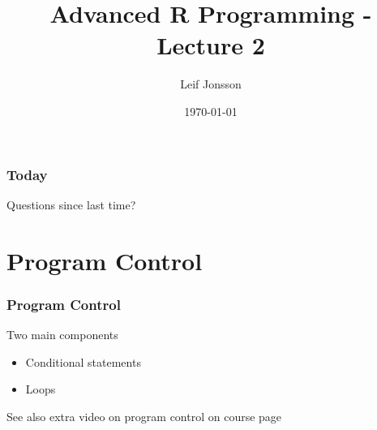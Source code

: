 \documentclass{beamer}
\title[Lecture 1]{Advanced R Programming - Lecture 2} %
\author{Leif Jonsson} %
\institute[STIMA LiU] %
{
Link\"{o}ping University \\ %
\medskip
\textit{leif.jonsson@ericsson.com\\leif.r.jonsson@liu.se} %
}
\date{\today} %
\begin{document}
\begin{frame}
\titlepage %
\end{frame}

\begin{frame}
\frametitle{Today} %
\tableofcontents %
\end{frame}


\begin{frame}
	\Huge{\centerline{Questions since last time?}}
\end{frame}

\section{Program Control} %

\begin{frame}
\frametitle{Program Control}
Two main components
\begin{itemize}
\item Conditional statements
\item Loops
\end{itemize}
See also extra video on program control on course page
\end{frame}

\end{document}
